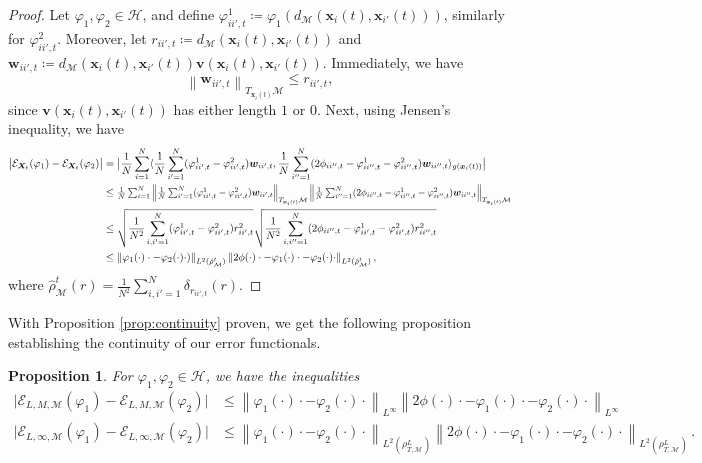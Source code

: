 \documentclass[11pt]{article}
\newcommand{\mbf}[1]{\boldsymbol{#1}}
\newcommand{\inprod}[1]{\langle #1 \rangle}
\newcommand{\abs}[1]{\big| #1 \big|}
\newcommand{\norm}[1]{\left\| #1 \right\|}
\newcommand{\bv}{\mbf{v}}
\newcommand{\bw}{\mbf{w}}
\newcommand{\bx}{\mbf{x}}
\newcommand{\bX}{\mbf{X}}
\newcommand{\mE}{\mathcal{E}}
\newcommand{\mH}{\mathcal{H}}
\newcommand{\mM}{\mathcal{M}}
\newcommand{\intkernel}{\phi}
\newcommand{\intkernelvar}{\varphi}
\newtheorem{prop}{Proposition}
\begin{document}
\begin{proof}
Let $\intkernelvar_1, \intkernelvar_2 \in \mH$, and define $\intkernelvar_{ii', t}^1 \coloneqq \intkernelvar_1(d_{\mM}(\bx_{i}(t), \bx_{i'}(t)))$, similarly for $\intkernelvar_{ii', t}^2$.  Moreover, let $r_{ii', t} \coloneqq d_{\mM}(\bx_i(t), \bx_{i'}(t))$ and $\bw_{ii', t} \coloneqq d_{\mM}(\bx_i(t), \bx_{i'}(t))\bv(\bx_i(t), \bx_{i'}(t))$.  Immediately, we have
\[
\norm{\bw_{ii', t}}_{T_{\bx_i(t)}\mM} \le r_{ii', t},
\]
since $\bv(\bx_i(t), \bx_{i'}(t))$ has either length $1$ or $0$.  Next, using Jensen's inequality, we have 
\begin{align*}
\abs{\mE_{\bX_t}(\intkernelvar_1) - \mE_{\bX_t}(\intkernelvar_2)}
&= \abs{\frac{1}{N}\sum_{i = 1}^N\inprod{\frac{1}{N}\sum_{i' = 1}^N(\intkernelvar_{ii', t}^1 - \intkernelvar_{ii', t}^2)\bw_{ii', t}, \frac{1}{N}\sum_{i'' = 1}^N(2\intkernel_{ii'', t} - \intkernelvar_{ii'', t}^1 - \intkernelvar_{ii'', t}^2)\bw_{ii'', t}}_{g(\bx_i(t))}}\\
&\le \scalebox{0.9}{$\frac{1}{N}\sum_{i = 1}^N\norm{\frac{1}{N}\sum_{i' = 1}^N(\intkernelvar_{ii', t}^1 - \intkernelvar_{ii', t}^2)\bw_{ii', t}}_{T_{\bx_i(t)}\mM}  \norm{\frac{1}{N}\sum_{i'' = 1}^N(2\intkernel_{ii'', t} - \intkernelvar_{ii'', t}^1 - \intkernelvar_{ii'', t}^2)\bw_{ii'', t}}_{T_{\bx_i(t)}\mM}$} \\
&\le \sqrt{\frac{1}{N^2}\sum_{i, i' = 1}^N(\intkernelvar_{ii', t}^1 - \intkernelvar_{ii', t}^2)r_{ii', t}^2}\sqrt{\frac{1}{N^2}\sum_{i, i'' = 1}^N(2\intkernel_{ii'', t} - \intkernelvar_{ii', t}^1 - \intkernelvar_{ii', t}^2)r_{ii'', t}^2} \\
&\le\norm{\intkernelvar_1(\cdot)\cdot - \intkernelvar_2(\cdot)\cdot)}_{L^2(\hat\rho^t_{\mM})}\norm{2\intkernel(\cdot)\cdot - \intkernelvar_1(\cdot)\cdot - \intkernelvar_2(\cdot)\cdot}_{L^2(\hat\rho^t_{\mM})}, 
\end{align*}
where 
$
\hat\rho^t_{\mM}(r) = \frac{1}{N^2}\sum_{i, i' = 1}^N\delta_{r_{ii', t}}(r)
$.
\end{proof}
With Proposition \ref{prop:continuity} proven, we get the following proposition establishing the continuity of our error functionals.
\begin{prop}
For $\intkernelvar_1, \intkernelvar_2 \in \mH$, we have the inequalities
\begin{equation}\label{ELM}
\begin{aligned}
\abs{\mE_{L, M,\mM}(\intkernelvar_1) - \mE_{L, M,\mM}(\intkernelvar_2)} &\le \norm{\intkernelvar_1(\cdot)\cdot - \intkernelvar_2(\cdot)\cdot}_{L^\infty}\norm{2\intkernel(\cdot)\cdot - \intkernelvar_1(\cdot)\cdot - \intkernelvar_2(\cdot)\cdot}_{L^\infty}\\
\abs{\mE_{L, \infty,\mM}(\intkernelvar_1) - \mE_{L, \infty,\mM}(\intkernelvar_2)} &\leq \norm{\intkernelvar_1(\cdot)\cdot - \intkernelvar_2(\cdot)\cdot}_{L^2(\rho_{T,\mM}^L)}\norm{2\intkernel(\cdot)\cdot - \intkernelvar_1(\cdot)\cdot - \intkernelvar_2(\cdot)\cdot}_{L^2(\rho_{T,\mathcal{M}}^L)}\,.
\end{aligned}
\end{equation}
\end{prop}
\end{document}
